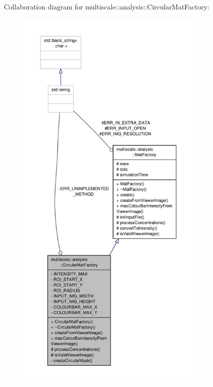 Collaboration diagram for multiscale\-:\-:analysis\-:\-:Circular\-Mat\-Factory\-:\nopagebreak
\begin{figure}[H]
\begin{center}
\leavevmode
\includegraphics[height=550pt]{classmultiscale_1_1analysis_1_1CircularMatFactory__coll__graph}
\end{center}
\end{figure}
